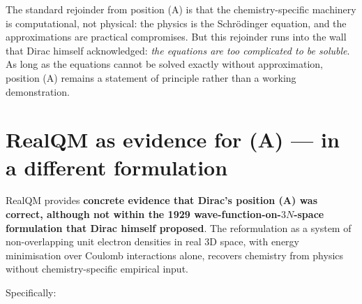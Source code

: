 The standard rejoinder from position (A) is that the chemistry-specific machinery is computational, not physical: the physics is the Schr\"odinger equation, and the approximations are practical compromises. But this rejoinder runs into the wall that Dirac himself acknowledged: \emph{the equations are too complicated to be soluble}. As long as the equations cannot be solved exactly without approximation, position (A) remains a statement of principle rather than a working demonstration.

\section{RealQM as evidence for (A) --- in a different formulation}\label{sec:realqm-evidence}

RealQM provides \textbf{concrete evidence that Dirac's position (A) was correct, although not within the 1929 wave-function-on-$3N$-space formulation that Dirac himself proposed}. The reformulation as a system of non-overlapping unit electron densities in real 3D space, with energy minimisation over Coulomb interactions alone, recovers chemistry from physics without chemistry-specific empirical input.

Specifically:

